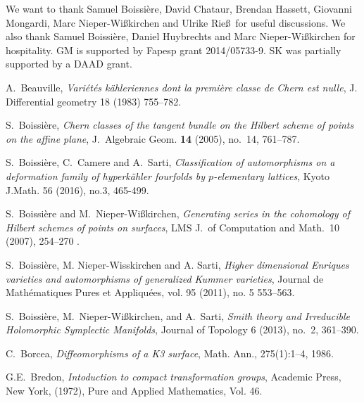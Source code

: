 \documentclass{alggeom}
\theoremstyle{plain}
\theoremstyle{definition}
\theoremstyle{remark}
\begin{document}
\begin{acknowledgements}
We want to thank Samuel Boissi\`ere, David Chataur, Brendan Hassett, Giovanni Mongardi, Marc Nieper-Wi\ss kirchen and Ulrike Rie\ss\ for useful discussions.
We also thank Samuel Boissi\`ere, Daniel Huybrechts and Marc Nieper-Wi\ss kirchen for hospitality.
GM is supported by Fapesp grant 2014/05733-9. SK was partially supported by a DAAD grant.
\end{acknowledgements}

\begin{thebibliography}{10}

A.~Beauville, \emph{Vari\'et\'es k\"ahleriennes dont la premi\`ere classe de Chern est nulle}, 
  J. Differential geometry 18 (1983) 755--782.

S.~Boissi\`ere, \emph{Chern classes of the tangent bundle on the Hilbert scheme of points
  on the affine plane}, J.~Algebraic Geom. \textbf{14} (2005), no.~14, 761--787.

S.~Boissi\`ere, C.~Camere and A.~Sarti, \emph{Classification of automorphisms on a deformation family of hyperk\"ahler
fourfolds by $p$-elementary lattices}, 
Kyoto J.Math. 56 (2016), no.3, 465-499.

S.~Boissi\`ere and M.~Nieper-Wi{\ss}kirchen, \emph{Generating series in the cohomology 
  of Hilbert schemes of points on surfaces}, LMS J.~of Computation and Math.~10 (2007), 254--270 .

S.~Boissi\`ere, M. Nieper-Wisskirchen and A. Sarti, 
\emph{Higher dimensional Enriques varieties and automorphisms of generalized Kummer varieties},
Journal de Math\'ematiques Pures et Appliqu\'ees,
vol. 95 (2011), no. 5 553--563.

S.~Boissi\`ere, M.~Nieper-Wi{\ss}kirchen, and A.~Sarti, \emph{Smith theory and 
  Irreducible Holomorphic Symplectic Manifolds}, Journal of Topology 6 (2013), no.~2, 361--390.

C.~Borcea,
\emph{Diffeomorphisms of a K3 surface},
Math. Ann., 275(1):1--4, 1986.

G.E.~Bredon,
\newblock \emph{Intoduction to compact transformation groups},
Academic Press, New York,
(1972), Pure and Applied Mathematics, Vol. 46.


\end{thebibliography}
\end{document}
